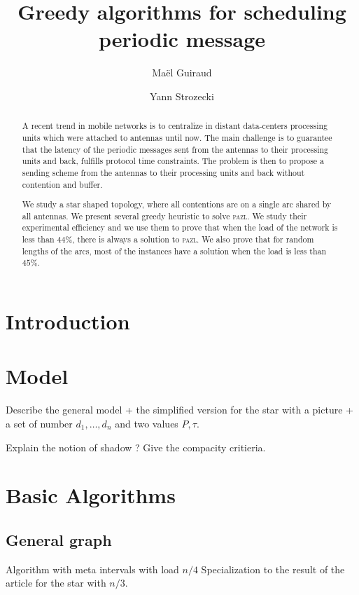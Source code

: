 \documentclass[10pt, conference, letterpaper]{IEEEtran}
\title{Greedy algorithms for scheduling periodic message }
\author[1,2]{Ma\"el Guiraud}
\author[1]{Yann Strozecki}
\affil[1]{David Laboratory, UVSQ}
\affil[2]{Nokia Bell Labs France}
\newcommand\pazl{\textsc{pazl}\xspace}
\begin{document}
\maketitle

\begin{abstract}

A recent trend in mobile networks is to centralize in distant data-centers  processing units which were attached to antennas until now. The main challenge is to guarantee that the latency of the periodic messages sent from the antennas to their processing units and back, fulfills protocol time constraints. The problem is then to propose a sending scheme from the antennas to their processing units and back without contention and buffer.

We study a star shaped topology, where all contentions are on a single arc shared by all antennas. We present several greedy heuristic to solve \pazl. We study their experimental efficiency and we use them to prove that when the load of the network is less than $44\%$, there is always a solution to \pazl. We also prove that for random lengths of the arcs, most of the instances have a solution when the load is less than $45\%$.  
\end{abstract}


\section{Introduction}


\section{Model}
Describe the general model + the simplified version for the star with a picture + a set of number $d_1,\dots,d_n$ and two values $P, \tau$. 
\cite{Guir1806:Deterministic}

Explain the notion of shadow ? Give the compacity critieria.

\section{Basic Algorithms}

\subsection{General graph}

Algorithm with meta intervals with load $n/4$
Specialization to the result of the article for the star with $n/3$.
\end{document}
